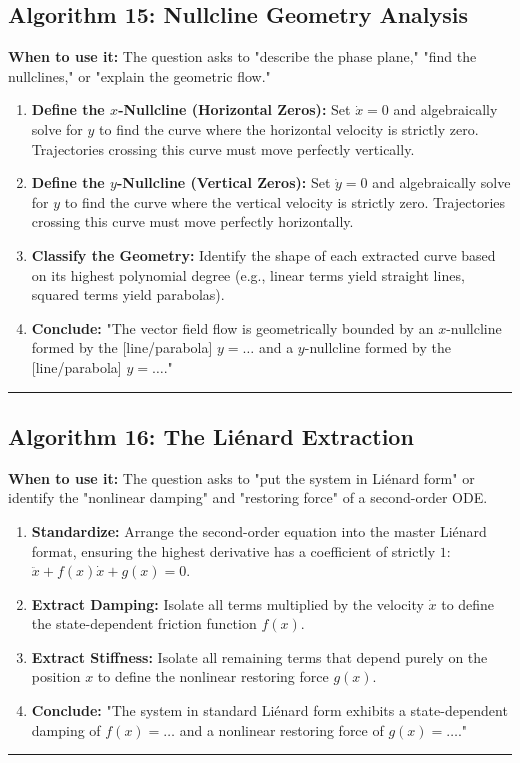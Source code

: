 \documentclass[11pt, a4paper]{report}
\begin{document}
\subsection*{Algorithm 15: Nullcline Geometry Analysis}
\textbf{When to use it:} The question asks to "describe the phase plane," "find the nullclines," or "explain the geometric flow."
\begin{enumerate}[label=\textbf{\arabic*.}]
    \item \textbf{Define the $x$-Nullcline (Horizontal Zeros):} Set $\dot{x} = 0$ and algebraically solve for $y$ to find the curve where the horizontal velocity is strictly zero. Trajectories crossing this curve must move perfectly vertically.
    \item \textbf{Define the $y$-Nullcline (Vertical Zeros):} Set $\dot{y} = 0$ and algebraically solve for $y$ to find the curve where the vertical velocity is strictly zero. Trajectories crossing this curve must move perfectly horizontally.
    \item \textbf{Classify the Geometry:} Identify the shape of each extracted curve based on its highest polynomial degree (e.g., linear terms yield straight lines, squared terms yield parabolas).
    \item \textbf{Conclude:} "The vector field flow is geometrically bounded by an $x$-nullcline formed by the [line/parabola] $y = \dots$ and a $y$-nullcline formed by the [line/parabola] $y = \dots$."
\end{enumerate}
\vspace{1em}
\noindent\rule{\textwidth}{0.4pt}
\vspace{1em}

\subsection*{Algorithm 16: The Liénard Extraction}
\textbf{When to use it:} The question asks to "put the system in Liénard form" or identify the "nonlinear damping" and "restoring force" of a second-order ODE.
\begin{enumerate}[label=\textbf{\arabic*.}]
    \item \textbf{Standardize:} Arrange the second-order equation into the master Liénard format, ensuring the highest derivative has a coefficient of strictly $1$: $\ddot{x} + f(x)\dot{x} + g(x) = 0$.
    \item \textbf{Extract Damping:} Isolate all terms multiplied by the velocity $\dot{x}$ to define the state-dependent friction function $f(x)$.
    \item \textbf{Extract Stiffness:} Isolate all remaining terms that depend purely on the position $x$ to define the nonlinear restoring force $g(x)$.
    \item \textbf{Conclude:} "The system in standard Liénard form exhibits a state-dependent damping of $f(x) = \dots$ and a nonlinear restoring force of $g(x) = \dots$."
\end{enumerate}
\vspace{1em}
\noindent\rule{\textwidth}{0.4pt}
\vspace{1em}
\end{document}
